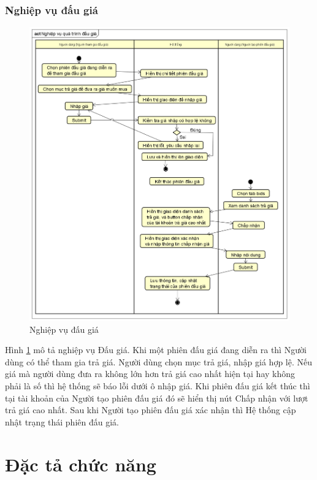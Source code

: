 \documentclass[../DoAn.tex]{subfiles}
\begin{document}
\subsubsection{Nghiệp vụ đấu giá}
\label{subsubsection:2.2.7.2}
\begin{figure}[H]
    \centering
    \includegraphics[width=0.75\linewidth,height=12.67cm]{Hinhve/nghiep_vu_dau_gia.png}
    \caption{Nghiệp vụ đấu giá}
    \label{fig:Fig28}
\end{figure}
Hình \ref{fig:Fig28} mô tả nghiệp vụ Đấu giá. Khi một phiên đấu giá đang diễn ra thì Người dùng có thể tham gia trả giá. Người dùng chọn mục trả giá, nhập giá hợp lệ. Nếu giá mà người dùng đưa ra không lớn hơn trả giá cao nhất hiện tại hay không phải là số thì hệ thống sẽ báo lỗi dưới ô nhập giá. Khi phiên đấu giá kết thúc thì tại tài khoản của Người tạo phiên đấu giá đó sẽ hiển thị nút Chấp nhận với lượt trả giá cao nhất. Sau khi Người tạo phiên đấu giá xác nhận thì Hệ thống cập nhật trạng thái phiên đấu giá.
\section{Đặc tả chức năng}
\label{section:2.3}
\end{document}
